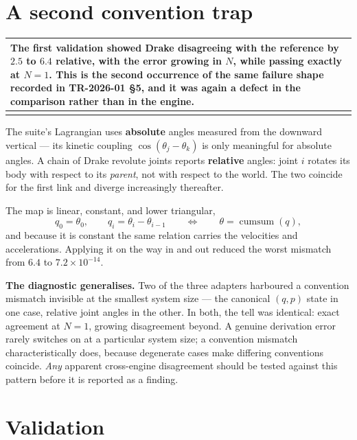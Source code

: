 \documentclass[11pt,a4paper]{article}
\makeatletter
\newenvironment{callout}
  {\par\medskip\noindent\begin{tabular}{@{}p{0.94\textwidth}@{}}
   \arrayrulecolor{warnrule}\hline\rule{0pt}{2.6ex}}
  {\\[0.8ex]\hline\arrayrulecolor{black}\end{tabular}\par\medskip}
\makeatother
\begin{document}
\section{A second convention trap}\label{sec:convention}

\begin{callout}
The first validation showed Drake disagreeing with the reference by $2.5$ to
$6.4$ relative, \textbf{with the error growing in $N$}, while passing exactly
at $N=1$. This is the second occurrence of the same failure shape recorded in
TR-2026-01 \S5, and it was again a defect in the comparison rather than in the
engine.
\end{callout}

The suite's Lagrangian uses \textbf{absolute} angles measured from the downward
vertical --- its kinetic coupling $\cos(\theta_j-\theta_k)$ is only meaningful
for absolute angles. A chain of Drake revolute joints reports \textbf{relative}
angles: joint $i$ rotates its body with respect to its \emph{parent}, not with
respect to the world. The two coincide for the first link and diverge
increasingly thereafter.

The map is linear, constant, and lower triangular,
\begin{equation}
q_0 = \theta_0, \qquad q_i = \theta_i - \theta_{i-1}
\qquad\Longleftrightarrow\qquad
\theta = \operatorname{cumsum}(q),
\end{equation}
and because it is constant the same relation carries the velocities and
accelerations. Applying it on the way in and out reduced the worst mismatch
from $6.4$ to $7.2\times10^{-14}$.

\medskip
\noindent\textbf{The diagnostic generalises.} Two of the three adapters
harboured a convention mismatch invisible at the smallest system size --- the
canonical $(q,p)$ state in one case, relative joint angles in the other. In
both, the tell was identical: exact agreement at $N=1$, growing disagreement
beyond. A genuine derivation error rarely switches on at a particular system
size; a convention mismatch characteristically does, because degenerate cases
make differing conventions coincide. \emph{Any} apparent cross-engine
disagreement should be tested against this pattern before it is reported as a
finding.

\section{Validation}
\end{document}
